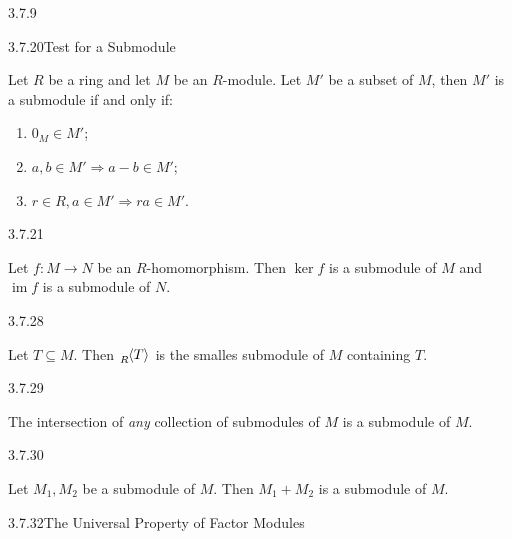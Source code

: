 \documentclass[10pt]{article} %
\DeclareMathOperator{\im}{im}
\begin{document}
\begin{multicols}{3}
\begin{example}{3.7.9}{}
\end{example}

\begin{proposition}{3.7.20}{Test for a Submodule}

    Let $R$ be a ring and let $M$ be an $R$-module. Let $M'$ be a subset of $M$, then $M'$ is a submodule if and only if:

        \begin{enumerate}[(1)]
            \setlength{\parskip}{0em}
            \item $0_M \in M'$;
            \item $a,b \in M' \Rightarrow a-b \in M'$;
            \item $r \in R, a \in M' \Rightarrow ra \in M'$.
        \end{enumerate}

\end{proposition}

\begin{lemma}{3.7.21}{}

    Let $f: M \to N$ be an $R$-homomorphism. Then $\ker{f}$ is a submodule of $M$ and $\im{f}$ is a submodule of $N$.

\end{lemma}

\begin{lemma}{3.7.28}{}

    Let $T \subseteq M$. Then $\tensor[_R]{\langle T \rangle}{}$ is the smalles submodule of $M$ containing $T$.

\end{lemma}

\begin{lemma}{3.7.29}{}

    The intersection of \emph{any} collection of submodules of $M$ is a submodule of $M$.

\end{lemma}

\begin{lemma}{3.7.30}{}

    Let $M_1,M_2$ be a submodule of $M$. Then $M_1 + M_2$ is a submodule of $M$.

\end{lemma}

\begin{theorem}{3.7.32}{The Universal Property of Factor Modules}


\end{theorem}
\end{multicols}
\end{document}
